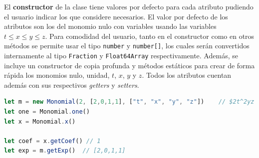 El \textbf{constructor} de la clase tiene valores por defecto para cada atributo pudiendo el usuario indicar los que considere necesarios. El valor por defecto de los atributos son los del monomio nulo con variables usando las variables $t\le x\le y\le z$. Para comodidad del usuario, tanto en el constructor como en otros métodos se permite usar el tipo \texttt{number} y \texttt{number[]}, los cuales serán convertidos internamente al tipo \texttt{Fraction} y \texttt{Float64Array} respectivamente. Además, se incluye un constructor de copia profunda y métodos estáticos para crear de forma rápida los monomios nulo, unidad, $t$, $x$, $y$ y $z$. Todos los atributos cuentan además con sus respectivos \textit{getters} y \textit{setters}.
\begin{lstlisting}[language=Javascript]
let m = new Monomial(2, [2,0,1,1], ["t", "x", "y", "z"])    // $2t^2yz en Q[t,x,y,z]$
let one = Monomial.one()
let x = Monomial.x()

let coef = x.getCoef() // 1
let exp = m.getExp()  // [2,0,1,1]
\end{lstlisting}

